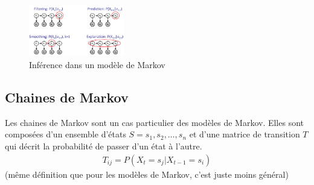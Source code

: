 \begin{figure}[H]
\begin{center}
        \includegraphics[width=0.37\textwidth]{pictures/inferencehmm.png}
    \end{center}
    \caption{Inférence dans un modèle de Markov}\label{fig:inferencehmm}
\end{figure}


\subsection{Chaines de Markov} %
\label{sub:chaines_de_markov}

Les chaines de Markov sont un cas particulier des modèles de Markov. 
Elles sont composées d'un ensemble d'états $S = {s_1, s_2, \dots, s_n}$ et d'une matrice de transition 
$T$ qui décrit la probabilité de passer d'un état à l'autre.
\begin{align*}
    T_{ij} = P(X_t = s_j | X_{t-1} = s_i) 
\end{align*} 
(même définition que pour les modèles de Markov, c'est juste moins général)







